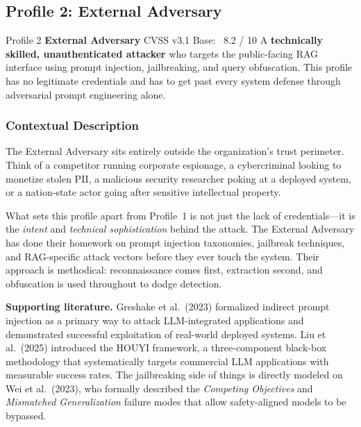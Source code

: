 \newpage
\subsection{Profile 2: External Adversary}

\begin{profilebanner}%
  {Profile 2 \enspace\textbf{External Adversary}}%
  {CVSS v3.1 Base: \badgehigh\ 8.2 / 10}
  \small
  A \textbf{technically skilled, unauthenticated attacker} who targets the
  public-facing RAG interface using prompt injection, jailbreaking, and query
  obfuscation. This profile has no legitimate credentials and has to get past
  every system defense through adversarial prompt engineering alone.
\end{profilebanner}

\subsubsection{Contextual Description}

\begin{prosebox}
The External Adversary sits entirely outside the organization's trust
perimeter. Think of a competitor running corporate espionage, a cybercriminal
looking to monetize stolen PII, a malicious security researcher poking at a
deployed system, or a nation-state actor going after sensitive intellectual
property.

What sets this profile apart from Profile~1 is not just the lack of
credentials---it is the \emph{intent} and \emph{technical sophistication}
behind the attack. The External Adversary has done their homework on prompt
injection taxonomies, jailbreak techniques, and RAG-specific attack vectors
before they ever touch the system. Their approach is methodical:
reconnaissance comes first, extraction second, and obfuscation is used
throughout to dodge detection.

\medskip
\textbf{Supporting literature.}
Greshake et al.\ (2023) formalized indirect prompt injection as a primary way
to attack LLM-integrated applications and demonstrated successful exploitation
of real-world deployed systems. Liu et al.\ (2025) introduced the HOUYI
framework, a three-component black-box methodology that systematically
targets commercial LLM applications with measurable success rates. The
jailbreaking side of things is directly modeled on Wei et al.\ (2023),
who formally described the \emph{Competing Objectives} and
\emph{Mismatched Generalization} failure modes that allow safety-aligned
models to be bypassed.
\end{prosebox}

